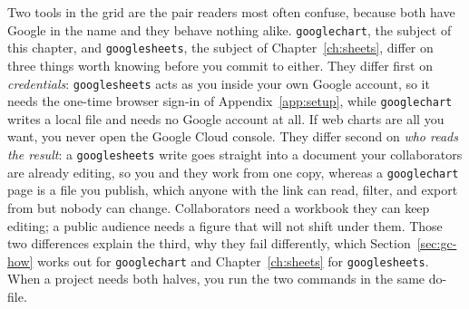 \documentclass[
    a4paper,
    fontsize=10pt,
    twoside=true,
    numbers=noenddot,
]{kaobook}
\begin{document}
Two tools in the grid are the pair readers most often confuse, because both have Google in the name and they behave nothing alike. \texttt{googlechart}, the subject of this chapter, and \texttt{googlesheets}, the subject of Chapter~\ref{ch:sheets}, differ on three things worth knowing before you commit to either. They differ first on \emph{credentials}: \texttt{googlesheets} acts as you inside your own Google account, so it needs the one-time browser sign-in of Appendix~\ref{app:setup}, while \texttt{googlechart} writes a local file and needs no Google account at all. If web charts are all you want, you never open the Google Cloud console. They differ second on \emph{who reads the result}: a \texttt{googlesheets} write goes straight into a document your collaborators are already editing, so you and they work from one copy, whereas a \texttt{googlechart} page is a file you publish, which anyone with the link can read, filter, and export from but nobody can change. Collaborators need a workbook they can keep editing; a public audience needs a figure that will not shift under them. Those two differences explain the third, why they fail differently, which Section~\ref{sec:gc-how} works out for \texttt{googlechart} and Chapter~\ref{ch:sheets} for \texttt{googlesheets}. When a project needs both halves, you run the two commands in the same do-file.
\end{document}
